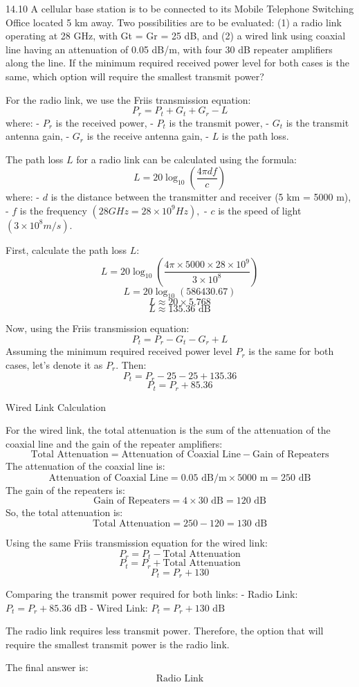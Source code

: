 \documentclass[cn,12pt]{homework}
\begin{document}
14.10 A cellular base station is to be connected to its Mobile Telephone Switching Office located 5 km
away. Two possibilities are to be evaluated: (1) a radio link operating at 28 GHz, with Gt = Gr =
25 dB, and (2) a wired link using coaxial line having an attenuation of 0.05 dB/m, with four 30 dB
repeater amplifiers along the line. If the minimum required received power level for both cases is the
same, which option will require the smallest transmit power?

\begin{solution}

For the radio link, we use the Friis transmission equation:
\[ P_r = P_t + G_t + G_r - L \]
where:
- \( P_r \) is the received power,
- \( P_t \) is the transmit power,
- \( G_t \) is the transmit antenna gain,
- \( G_r \) is the receive antenna gain,
- \( L \) is the path loss.

The path loss \( L \) for a radio link can be calculated using the formula:
\[ L = 20 \log_{10} \left( \frac{4\pi d f}{c} \right) \]
where:
- \( d \) is the distance between the transmitter and receiver (5 km = 5000 m),
- \( f \) is the frequency $(28 GHz = 28 \times 10^9 Hz),$
- \( c \) is the speed of light $(3 \times 10^8 m/s).$

First, calculate the path loss \( L \):
\[ L = 20 \log_{10} \left( \frac{4\pi \times 5000 \times 28 \times 10^9}{3 \times 10^8} \right) \]
\[ L = 20 \log_{10} (586430.67) \]
\[ L \approx 20 \times 5.768 \]
\[ L \approx 135.36 \text{ dB} \]

Now, using the Friis transmission equation:
\[ P_t = P_r - G_t - G_r + L \]
Assuming the minimum required received power level \( P_r \) is the same for both cases, let's denote it as \( P_r \). Then:
\[ P_t = P_r - 25 - 25 + 135.36 \]
\[ P_t = P_r + 85.36 \]

Wired Link Calculation

For the wired link, the total attenuation is the sum of the attenuation of the coaxial line and the gain of the repeater amplifiers:
\[ \text{Total Attenuation} = \text{Attenuation of Coaxial Line} - \text{Gain of Repeaters} \]
The attenuation of the coaxial line is:
\[ \text{Attenuation of Coaxial Line} = 0.05 \text{ dB/m} \times 5000 \text{ m} = 250 \text{ dB} \]
The gain of the repeaters is:
\[ \text{Gain of Repeaters} = 4 \times 30 \text{ dB} = 120 \text{ dB} \]
So, the total attenuation is:
\[ \text{Total Attenuation} = 250 - 120 = 130 \text{ dB} \]

Using the same Friis transmission equation for the wired link:
\[ P_r = P_t - \text{Total Attenuation} \]
\[ P_t = P_r + \text{Total Attenuation} \]
\[ P_t = P_r + 130 \]


Comparing the transmit power required for both links:
- Radio Link: \( P_t = P_r + 85.36 \text{ dB} \)
- Wired Link: \( P_t = P_r + 130 \text{ dB} \)

The radio link requires less transmit power. Therefore, the option that will require the smallest transmit power is the radio link.

The final answer is:
\[
\boxed{\text{Radio Link}}
\]
\end{solution}
\end{document}
